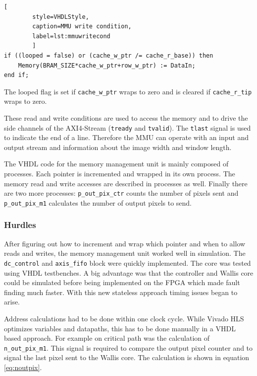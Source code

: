 \begin{minipage}{\linewidth}
    \begin{lstlisting}[
        style=VHDLStyle, 
        caption=MMU write condition, 
        label=lst:mmuwritecond
        ]
if ((looped = false) or (cache_w_ptr /= cache_r_base)) then
    Memory(BRAM_SIZE*cache_w_ptr+row_w_ptr) := DataIn;
end if;\end{lstlisting}
\end{minipage}

The looped flag is set if \texttt{cache\_w\_ptr} wraps to zero and is cleared if
\texttt{cache\_r\_tip} wraps to zero.

These read and write conditions are used to access the memory and to drive the
side channels of the AXI4-Stream (\texttt{tready} and \texttt{tvalid}). The 
\texttt{tlast} signal is used to indicate the end of a line. Therefore the MMU
can operate with an input and output stream and information about the image
width and window length.

The VHDL code for the memory management unit is mainly composed of processes.
Each pointer is incremented and wrapped in its own process. The memory read and
write accesses are described in processes as well. Finally there are two more
processes: \texttt{p\_out\_pix\_ctr} counts the number of pixels sent and
\texttt{p\_out\_pix\_m1} calculates the number of output pixels to send.



\subsubsection*{Hurdles}
After figuring out how to increment and wrap which pointer and when to allow
reads and writes, the memory management unit worked well in simulation. The
\texttt{dc\_control} and \texttt{axis\_fifo} block were quickly implemented. The
core was tested using VHDL testbenches. A big advantage was that the controller
and Wallis core could be simulated before being implemented on the FPGA which
made fault finding much faster. With this new stateless approach timing issues
began to arise. 

Address calculations had to be done within one clock cycle. While Vivado HLS
optimizes variables and datapaths, this has to be done manually in a VHDL based
approach. For example on critical path was the calculation of 
\texttt{n\_out\_pix\_m1}. This signal is required to compare the output pixel
counter and to signal the last pixel sent to the Wallis core. The calculation is
shown in equation \ref{eq:noutpix}.

